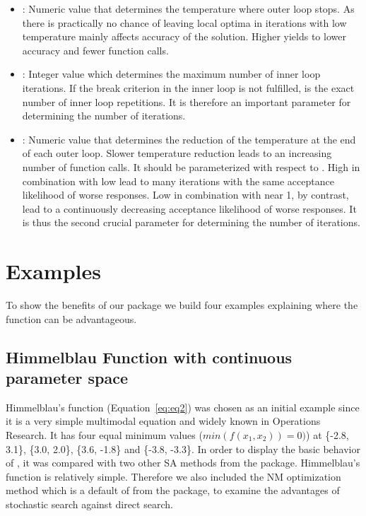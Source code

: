 \begin{itemize}
\item {}: Numeric value that determines the temperature where outer loop stops. As there is practically no chance of leaving local optima in iterations with low temperature  mainly affects accuracy of the solution. Higher  yields to lower accuracy and fewer function calls.
\item {}: Integer value which determines the maximum number of inner loop iterations. If the break criterion in the inner loop is not fulfilled,  is the exact number of inner loop repetitions. It is therefore an important parameter for determining the number of iterations.
\item {}: Numeric value that determines the reduction of the temperature at the end of each outer loop. Slower temperature reduction leads to an increasing number of function calls. It should be parameterized with respect to . High  in combination with low  lead to many iterations with the same acceptance likelihood of worse responses. Low  in combination with  near 1, by contrast, lead to a continuously decreasing acceptance likelihood of worse responses. It is thus the second crucial parameter for determining the number of iterations.
\end{itemize}

\section{Examples}
To show the benefits of our  package we build four examples explaining where the  function can be advantageous.

\subsection{Himmelblau Function with continuous parameter space}
Himmelblau’s function (Equation~\eqref{eq:eq2}) \citep{himmelblau_1972} was chosen as an initial example since it is a very simple multimodal equation and widely known in Operations Research. It has four equal minimum values ($min(f(x_1,x_2))=0)$) at \{-2.8, 3.1\}, \{3.0, 2.0\}, \{3.6, -1.8\} and \{-3.8, -3.3\}. In order to display the basic behavior of , it was compared with two other SA methods from the  package. Himmelblau’s function is relatively simple. Therefore we also included the NM optimization method \citep{nelder_1965} which is a default of  from the  package, to examine the advantages of stochastic search against direct search.

